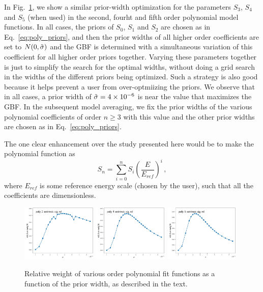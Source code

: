 \documentclass[prd,10pt,superscriptaddress,notitlepage,tightenlines,nofootinbib,floatfix]{revtex4-1}
\begin{document}
In Fig.~\ref{fig:poly_prior}, we show a similar prior-width optimization for the parameters $S_3$, $S_4$ and $S_5$ (when used) in the second, fourht and fifth order polynomial model functions.  In all cases, the priors of $S_0$, $S_1$ and $S_2$ are chosen as in Eq.~\eqref{eq:poly_priors}, and then the prior widths of all higher order coefficients are set to $N(0,\tilde{{\sigma}})$ and the GBF is determined with a simultaneous variation of this coefficient for all higher order priors together.
Varying these parameters together is just to simplify the search for the optimal widths, without doing a grid search in the widths of the different priors being optimized.  Such a strategy is also good because it helps prevent a user from over-optmiizing the priors.
We observe that in all cases, a prior width of $\tilde{{\sigma}}=4\times10^{-6}$ is near the value that maximizes the GBF.
In the subsequent model averaging, we fix the prior widths of the various polynomial coefficients of order $n\geq3$ with this value and the other prior widths are chosen as in Eq.~\eqref{eq:poly_priors}.

The one clear enhancement over the study presented here would be to make the polynomial function as 
\begin{equation}
    S_n = \sum_{i=0}^n S_i \left(\frac{E}{E_{ref}}\right)^i\, ,
\end{equation}
where $E_{ref}$ is some reference energy scale (chosen by the user), such that all the coefficients are dimensionless.

\begin{figure}
\includegraphics[width=0.32\textwidth]{figures/poly_2_extrinsic_sig_rel_prior_width_study}
\includegraphics[width=0.32\textwidth]{figures/poly_4_extrinsic_sig_rel_prior_width_study}
\includegraphics[width=0.32\textwidth]{figures/poly_5_extrinsic_sig_rel_prior_width_study}
\caption{\label{fig:poly_prior}
Relative weight of various order polynomial fit functions as a function of the prior width, as described in the text.}
\end{figure}
\end{document}
